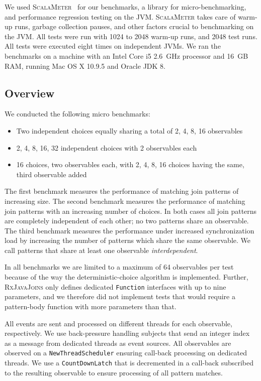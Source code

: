 \documentclass[runningheads]{llncs}
\begin{document}
\begin{sloppypar}
We used \textsc{ScalaMeter}~\cite{ScalaMeter} for our benchmarks, a library
for micro-benchmarking, and performance regression testing on the JVM.
\textsc{ScalaMeter} takes care of warm-up runs, garbage collection pauses, and
other factors crucial to benchmarking on the JVM. All tests were run with 1024
to 2048 warm-up runs, and 2048 test runs. All tests were executed eight times
on independent JVMs. We ran the benchmarks on a machine with an Intel Core i5
2.6~GHz processor and 16~GB RAM, running Mac OS X 10.9.5 and Oracle JDK 8.

\subsection{Overview}

We conducted the following micro benchmarks:

\begin{itemize}
\item Two independent choices equally sharing a total of 2, 4, 8, 16 observables
\item 2, 4, 8, 16, 32 independent choices with 2 observables each 
\item 16 choices, two observables each, with 2, 4, 8, 16 choices having the same, third observable added
\end{itemize}
\noindent
The first benchmark measures the performance of matching join patterns of
increasing size. The second benchmark measures the performance of matching
join patterns with an increasing number of choices. In both cases all join
patterns are completely independent of each other; no two patterns share an
observable. The third benchmark measures the performance under increased
synchronization load by increasing the number of patterns which share the same
observable. We call patterns that share at least one observable
\emph{interdependent}.

In all benchmarks we are limited to a maximum of 64 observables per test
because of the way the deterministic-choice algorithm is implemented. Further,
\textsc{RxJavaJoins} only defines dedicated \texttt{Function} interfaces with
up to nine parameters, and we therefore did not implement tests that would
require a pattern-body function with more parameters than that.

All events are sent and processed on different threads for each observable,
respectively. We use back-pressure handling subjects that send an integer
index as a message from dedicated threads as event sources. All observables
are observed on a \texttt{NewThreadScheduler} ensuring call-back processing on
dedicated threads. We use a \texttt{CountDownLatch} that is decremented in a
call-back subscribed to the resulting observable to ensure processing of all
pattern matches.


\end{sloppypar}
\end{document}
